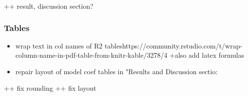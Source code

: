 \documentclass[
]{article}
\begin{document}
++ result, discussion section?

\hypertarget{tables}{%
\subsubsection{Tables}\label{tables}}

\begin{itemize}
\item
  wrap text in col names of R2
  tableshttps://community.rstudio.com/t/wrap-column-name-in-pdf-table-from-knitr-kable/3278/4
  +also add latex formulas
\item
  repair layout of model coef tables in "Results and Discussion sectio:
\end{itemize}

++ fix rounding ++ fix layout
\end{document}
